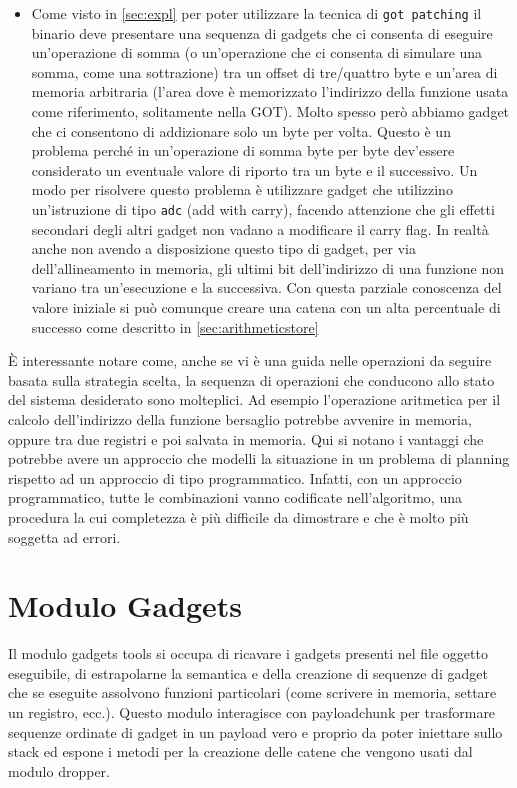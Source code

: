 \begin{inparaenum}[1)]
\begin{itemize}
  \item Come visto in \ref{sec:expl} per poter utilizzare la tecnica
    di \lstinline{got patching} il binario deve presentare una
    sequenza di gadgets che ci consenta di eseguire un'operazione di
    somma (o un'operazione che ci consenta di simulare una somma, come
    una sottrazione) tra un offset di tre/quattro byte e un'area di
    memoria arbitraria (l'area dove è memorizzato l'indirizzo della
    funzione usata come riferimento, solitamente nella GOT). Molto
    spesso però abbiamo gadget che ci consentono di addizionare solo
    un byte per volta. Questo è un problema perché in un'operazione di
    somma byte per byte dev'essere considerato un eventuale valore di
    riporto tra un byte e il successivo. Un modo per risolvere questo
    problema è utilizzare gadget che utilizzino un'istruzione di tipo
    \lstinline{adc} (add with carry), facendo attenzione che gli
    effetti secondari degli altri gadget non vadano a modificare il
    carry flag. In realtà anche non avendo a disposizione questo tipo
    di gadget, per via dell'allineamento in memoria, gli ultimi bit
    dell'indirizzo di una funzione non variano tra un'esecuzione e la
    successiva. Con questa parziale conoscenza del valore iniziale si
    può comunque creare una catena con un alta percentuale di successo
    come descritto in \ref{sec:arithmeticstore}
\end{itemize}

È interessante notare come, anche se vi è una guida nelle operazioni
da seguire basata sulla strategia scelta, la sequenza di operazioni
che conducono allo stato del sistema desiderato sono molteplici. Ad
esempio l'operazione aritmetica per il calcolo dell'indirizzo della
funzione bersaglio potrebbe avvenire in memoria, oppure tra due
registri e poi salvata in memoria. Qui si notano i vantaggi che
potrebbe avere un approccio che modelli la situazione in un problema
di planning rispetto ad un approccio di tipo programmatico. Infatti,
con un approccio programmatico, tutte le combinazioni vanno codificate
nell'algoritmo, una procedura la cui completezza è più difficile da
dimostrare e che è molto più soggetta ad errori.

\section{Modulo Gadgets}

Il modulo gadgets tools si occupa di ricavare i gadgets presenti nel
file oggetto eseguibile, di estrapolarne la semantica e della
creazione di sequenze di gadget che se eseguite assolvono funzioni
particolari (come scrivere in memoria, settare un registro,
ecc.). Questo modulo interagisce con payloadchunk per trasformare
sequenze ordinate di gadget in un payload vero e proprio da poter
iniettare sullo stack ed espone i metodi per la creazione delle catene
che vengono usati dal modulo dropper.


\end{inparaenum}
